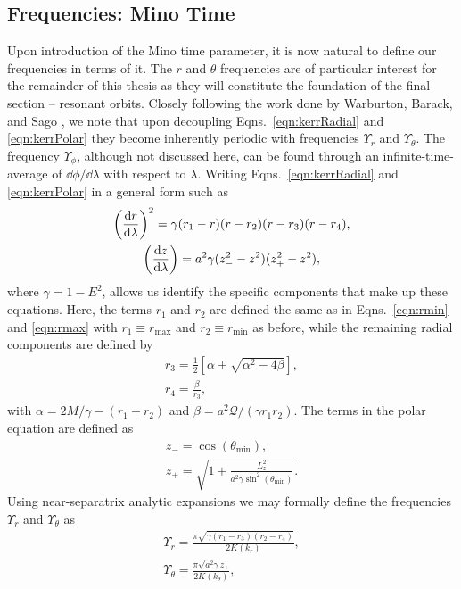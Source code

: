 
\subsection{Frequencies: Mino Time}
Upon introduction of the Mino time parameter, it is now natural to define our frequencies in terms of it.
The $r$ and $\theta$ frequencies are of particular interest for the remainder of this thesis as they will constitute the foundation of the final section -- resonant orbits.
Closely following the work done by Warburton, Barack, and Sago \cite{warburtonKerrGeodesics}, we note that upon decoupling Eqns.~\eqref{eqn:kerrRadial} and \eqref{eqn:kerrPolar} they become inherently periodic with frequencies $\Upsilon_r$ and $\Upsilon_\theta$.
The frequency $\Upsilon_\phi$, although not discussed here, can be found through an infinite-time-average of $\dd{\phi}/\dd{\lambda}$ with respect to $\lambda$.
Writing Eqns.~\eqref{eqn:kerrRadial} and \eqref{eqn:kerrPolar} in a general form such as
\begin{gather}
    \left(\dv{r}{\lambda}\right)^2=\gamma(r_1-r)(r-r_2)(r-r_3)(r-r_4),\\
    \left(\dv{z}{\lambda} \right) = a^2\gamma(z_-^2-z^2)(z_+^2-z^2),
\end{gather}
where $\gamma=1-E^2$, allows us identify the specific components that make up these equations.
Here, the terms $r_1$ and $r_2$ are defined the same as in Eqns.~\eqref{eqn:rmin} and \eqref{eqn:rmax} with $r_1\equiv r_{\text{max}}$ and $r_2\equiv r_\text{min}$ as before, while the remaining radial components are defined by
\begin{gather}
r_3=\frac{1}{2}\left[\alpha+\sqrt{\alpha^2-4\beta} \right],\\
r_4=\frac{\beta}{r_3},
\end{gather}
with $\alpha=2M/\gamma - (r_1+r_2)$ and $\beta=a^2\mathcal{Q}/(\gamma r_1 r_2)$.
The terms in the polar equation are defined as
\begin{gather}
z_-=\cos(\theta_\text{min}),\\
z_+=\sqrt{1+\frac{L_z^2}{a^2\gamma\sin^2(\theta_\text{min})}}.
\end{gather}
Using near-separatrix analytic expansions we may formally define the frequencies $\Upsilon_r$ and $\Upsilon_\theta$ as
\begin{gather}
\Upsilon_r=\frac{\pi\sqrt{\gamma(r_1-r_3)(r_2-r_4)}}{2K(k_r)},\\
\Upsilon_\theta=\frac{\pi\sqrt{a^2\gamma}z_+}{2K(k_\theta)},
\end{gather}
